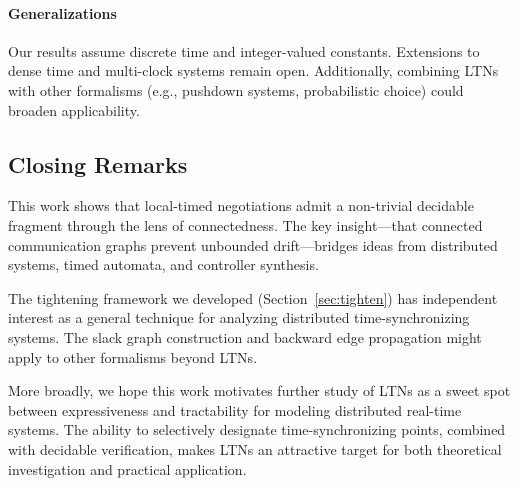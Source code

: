 \paragraph*{Generalizations}

Our results assume discrete time and integer-valued constants. Extensions to dense time and multi-clock systems remain open. Additionally, combining LTNs with other formalisms (e.g., pushdown systems, probabilistic choice) could broaden applicability.

\subsection{Closing Remarks}

This work shows that local-timed negotiations admit a non-trivial decidable fragment through the lens of connectedness. The key insight---that connected communication graphs prevent unbounded drift---bridges ideas from distributed systems, timed automata, and controller synthesis.

The tightening framework we developed (Section~\ref{sec:tighten}) has independent interest as a general technique for analyzing distributed time-synchronizing systems. The slack graph construction and backward edge propagation might apply to other formalisms beyond LTNs.

More broadly, we hope this work motivates further study of LTNs as a sweet spot between expressiveness and tractability for modeling distributed real-time systems. The ability to selectively designate time-synchronizing points, combined with decidable verification, makes LTNs an attractive target for both theoretical investigation and practical application.